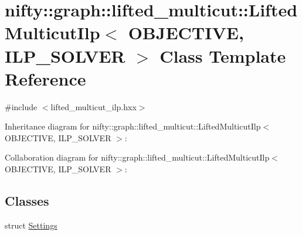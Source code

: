 \hypertarget{classnifty_1_1graph_1_1lifted__multicut_1_1LiftedMulticutIlp}{}\section{nifty\+:\+:graph\+:\+:lifted\+\_\+multicut\+:\+:Lifted\+Multicut\+Ilp$<$ O\+B\+J\+E\+C\+T\+I\+V\+E, I\+L\+P\+\_\+\+S\+O\+L\+V\+E\+R $>$ Class Template Reference}
\label{classnifty_1_1graph_1_1lifted__multicut_1_1LiftedMulticutIlp}


{\ttfamily \#include $<$lifted\+\_\+multicut\+\_\+ilp.\+hxx$>$}



Inheritance diagram for nifty\+:\+:graph\+:\+:lifted\+\_\+multicut\+:\+:Lifted\+Multicut\+Ilp$<$ O\+B\+J\+E\+C\+T\+I\+V\+E, I\+L\+P\+\_\+\+S\+O\+L\+V\+E\+R $>$\+:


Collaboration diagram for nifty\+:\+:graph\+:\+:lifted\+\_\+multicut\+:\+:Lifted\+Multicut\+Ilp$<$ O\+B\+J\+E\+C\+T\+I\+V\+E, I\+L\+P\+\_\+\+S\+O\+L\+V\+E\+R $>$\+:
\subsection*{Classes}
\begin{DoxyCompactItemize}
\item 
struct \hyperlink{structnifty_1_1graph_1_1lifted__multicut_1_1LiftedMulticutIlp_1_1Settings}{Settings}
\end{DoxyCompactItemize}
